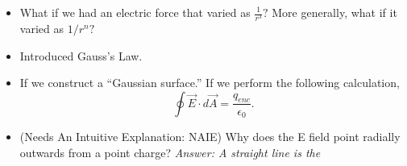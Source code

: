 \documentclass[12pt]{extreport}
\begin{document}
\begin{itemize}
\begin{itemize}
			\item What if we had an electric force that varied as $\frac 1 {r^3}?$ More generally, what if it varied as $1/r^n?$

			\item Introduced Gauss's Law.

			\item If we construct a ``Gaussian surface.'' If we perform the following calculation, $$\oint \vec E \cdot d \vec A = \frac{q_{enc}}{\epsilon_0}.$$

			\item (Needs An Intuitive Explanation: NAIE) Why does the E field point radially outwards from a point charge?
			\textit{Answer: A straight line is the }
		\end{itemize}
\end{itemize}
\end{document}
